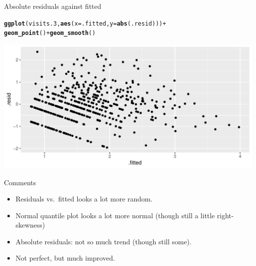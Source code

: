 \documentclass[unknownkeysallowed]{beamer}\usepackage[]{graphicx}\usepackage[]{color}
\makeatletter
\def\maxwidth{ %
  \ifdim\Gin@nat@width>\linewidth
    \linewidth
  \else
    \Gin@nat@width
  \fi
}
\newcommand{\hlopt}[1]{\textcolor[rgb]{0,0,0}{#1}}%
\newcommand{\hlstd}[1]{\textcolor[rgb]{0.345,0.345,0.345}{#1}}%
\newcommand{\hlkwc}[1]{\textcolor[rgb]{0.333,0.667,0.333}{#1}}%
\newcommand{\hlkwd}[1]{\textcolor[rgb]{0.737,0.353,0.396}{\textbf{#1}}}%
\newenvironment{kframe}{%
 \def\at@end@of@kframe{}%
 \ifinner\ifhmode%
  \def\at@end@of@kframe{\end{minipage}}%
  \begin{minipage}{\columnwidth}%
 \fi\fi%
 \def\FrameCommand##1{\hskip\@totalleftmargin \hskip-\fboxsep
 \colorbox{shadecolor}{##1}\hskip-\fboxsep
     \hskip-\linewidth \hskip-\@totalleftmargin \hskip\columnwidth}%
 \MakeFramed {\advance\hsize-\width
   \@totalleftmargin\z@ \linewidth\hsize
   \@setminipage}}%
 {\par\unskip\endMakeFramed%
 \at@end@of@kframe}
\newenvironment{knitrout}{}{} %
\makeatother
\begin{document}
\begin{frame}[fragile]{Absolute residuals against fitted}
  
\begin{knitrout}
\color{fgcolor}\begin{kframe}
\begin{alltt}
\hlkwd{ggplot}\hlstd{(visits.3,}\hlkwd{aes}\hlstd{(}\hlkwc{x}\hlstd{=.fitted,}\hlkwc{y}\hlstd{=}\hlkwd{abs}\hlstd{(.resid)))}\hlopt{+}
  \hlkwd{geom_point}\hlstd{()}\hlopt{+}\hlkwd{geom_smooth}\hlstd{()}
\end{alltt}


{\ttfamily\noindent\itshape{}}\end{kframe}
\includegraphics[width=\maxwidth]{figure/unnamed-chunk-36-1} 

\end{knitrout}
  
\end{frame}

\begin{frame}[fragile]{Comments}
  
  \begin{itemize}
  \item Residuals vs.\ fitted looks a lot more random.
  \item Normal quantile plot looks a lot more normal (though still a
    little right-skewness)
  \item Absolute residuals: not so much trend (though still some).
  \item Not perfect, but much improved.
  \end{itemize}
  
\end{frame}
\end{document}
